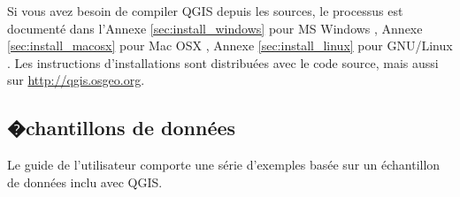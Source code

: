 Si vous avez besoin de compiler QGIS depuis les sources, le processus est document\'e dans l'Annexe \ref{sec:install_windows} pour MS Windows \win, Annexe \ref{sec:install_macosx} pour Mac OSX \osx, Annexe \ref{sec:install_linux} pour GNU/Linux \nix. Les instructions d'installations sont distribu\'ees avec le code source, mais aussi sur \url{http://qgis.osgeo.org}.

%
%
%

\subsection{�chantillons de donn\'ees}\label{label_sampledata}  

Le guide de l'utilisateur comporte une s\'erie d'exemples bas\'ee sur un \'echantillon de donn\'ees inclu avec QGIS.

